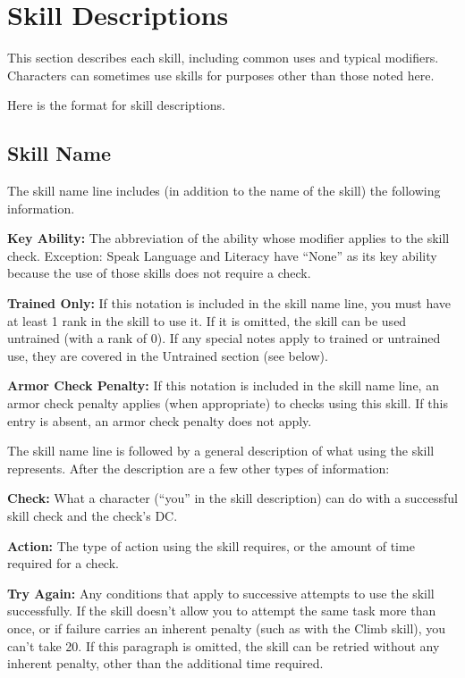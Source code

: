 \section{Skill Descriptions}
This section describes each skill, including common uses and typical modifiers. Characters can sometimes use skills for purposes other than those noted here.

Here is the format for skill descriptions.

\subsection{Skill Name}
The skill name line includes (in addition to the name of the skill) the following information.

\textbf{Key Ability:} The abbreviation of the ability whose modifier applies to the skill check. Exception: Speak Language and Literacy have ``None'' as its key ability because the use of those skills does not require a check.

\textbf{Trained Only:} If this notation is included in the skill name line, you must have at least 1 rank in the skill to use it. If it is omitted, the skill can be used untrained (with a rank of 0). If any special notes apply to trained or untrained use, they are covered in the Untrained section (see below).

\textbf{Armor Check Penalty:} If this notation is included in the skill name line, an armor check penalty applies (when appropriate) to checks using this skill. If this entry is absent, an armor check penalty does not apply.

The skill name line is followed by a general description of what using the skill represents. After the description are a few other types of information:

\textbf{Check:} What a character (``you'' in the skill description) can do with a successful skill check and the check's DC.

\textbf{Action:} The type of action using the skill requires, or the amount of time required for a check.

\textbf{Try Again:} Any conditions that apply to successive attempts to use the skill successfully. If the skill doesn't allow you to attempt the same task more than once, or if failure carries an inherent penalty (such as with the Climb skill), you can't take 20. If this paragraph is omitted, the skill can be retried without any inherent penalty, other than the additional time required.

